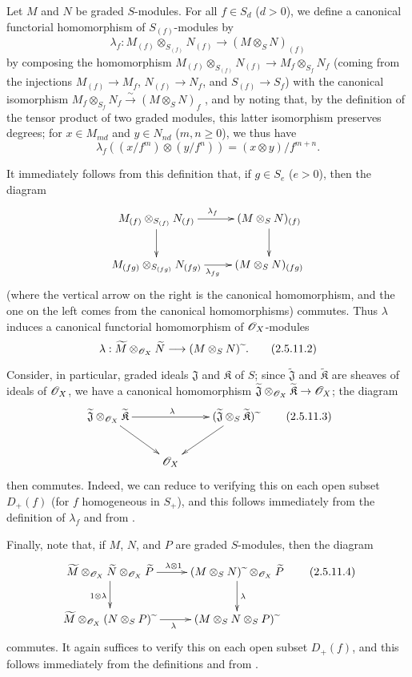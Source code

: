 \begin{env}[2.5.11]
\label{II.2.5.11}
Let $M$ and $N$ be graded $S$-modules.
For all $f\in S_d$ ($d>0$), we define a canonical functorial homomorphism of $S_{(f)}$-modules by
\[
\label{II.2.5.11.1}
  \lambda_f: M_{(f)}\otimes_{S_{(f)}}N_{(f)} \to (M\otimes_S N)_{(f)}
\tag{2.5.11.1}
\]
by composing the homomorphism $M_{(f)}\otimes_{S_{(f)}}N_{(f)}\to M_f\otimes_{S_f}N_f$ (coming from the injections $M_{(f)}\to M_f$, $N_{(f)}\to N_f$, and $S_{(f)}\to S_f$) with the canonical isomorphism $M_f\otimes_{S_f}N_f\xrightarrow{\sim}(M\otimes_S N)_f$ , and by noting that, by the definition of the tensor product of two graded modules, this latter isomorphism preserves degrees;
for $x\in M_{md}$ and $y\in N_{nd}$ ($m,n\geq0$), we thus have
\[
  \lambda_f((x/f^m)\otimes(y/f^n)) = (x\otimes y)/f^{m+n}.
\]

It immediately follows from this definition that, if $g\in S_e$ ($e>0$), then the diagram
\[
  \xymatrix{
    M_{(f)}\otimes_{S_{(f)}}N_{(f)} \ar[r]^{\lambda_f} \ar[d]
    & (M\otimes_S N)_{(f)} \ar[d]
  \\M_{(fg)}\otimes_{S_{(fg)}}N_{(fg)} \ar[r]_{\lambda_{fg}}
    & (M\otimes_S N)_{(fg)}
  }
\]
(where the vertical arrow on the right is the canonical homomorphism, and the one on the left comes from the canonical homomorphisms) commutes.
Thus $\lambda$ induces a canonical functorial homomorphism of $\mathscr{O}_X$-modules
\[
\label{II.2.5.11.2}
  \lambda: \widetilde{M}\otimes_{\sh{O}_X}\widetilde{N} \to (M\otimes_S N)\supertilde.
\tag{2.5.11.2}
\]

Consider, in particular, graded ideals $\mathfrak{J}$ and $\mathfrak{K}$ of $S$;
since $\widetilde{\mathfrak{J}}$ and $\widetilde{\mathfrak{K}}$ are sheaves of ideals of $\mathscr{O}_X$, we have a canonical homomorphism $\widetilde{\mathfrak{J}}\otimes_{\sh{O}_X}\widetilde{\mathfrak{K}}\to\sh{O}_X$;
the diagram
\[
\label{II.2.5.11.3}
  \xymatrix{
    \widetilde{\mathfrak{J}}\otimes_{\sh{O}_X}\widetilde{\mathfrak{K}} \ar[rr]^\lambda \ar[dr]
    && (\widetilde{\mathfrak{J}}\otimes_S\widetilde{\mathfrak{K}})\supertilde \ar[dl]
  \\&\sh{O}_X&
  }
\tag{2.5.11.3}
\]
then commutes.
Indeed, we can reduce to verifying this on each open subset $D_+(f)$ (for $f$ homogeneous in $S_+$), and this follows immediately from the definition  of $\lambda_f$ and from .

Finally, note that, if $M$, $N$, and $P$ are graded $S$-modules, then the diagram
\[
\label{II.2.5.11.4}
  \xymatrix{
    \widetilde{M}\otimes_{\sh{O}_X}\widetilde{N}\otimes_{\sh{O}_X}\widetilde{P} \ar[r]^{\lambda\otimes1} \ar[d]_{1\otimes\lambda}
    & (M\otimes_S N)\supertilde\otimes_{\sh{O}_X}\widetilde{P} \ar[d]^\lambda
  \\\widetilde{M}\otimes_{\sh{O}_X}(N\otimes_S P)\supertilde \ar[r]_\lambda
    & (M\otimes_S N\otimes_S P)\supertilde
  }
\tag{2.5.11.4}
\]
commutes.
It again suffices to verify this on each open subset $D_+(f)$, and this follows immediately from the definitions and from .
\end{env}

